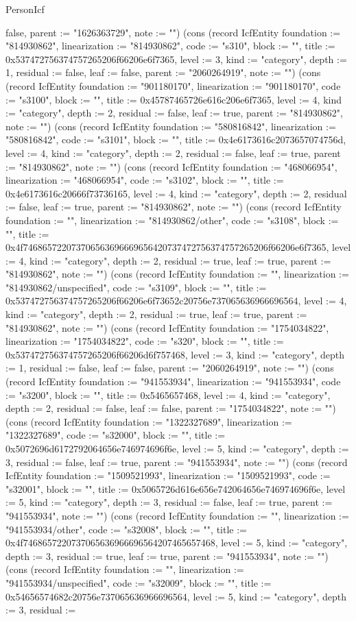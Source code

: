 \begin{lexlean}{PersonIcf}
\begin{semanticmodule}
{false, parent := "1626363729", note := ""}) (cons (record IcfEntity {foundation := "814930862", linearization := "814930862", code := "s310", block := "", title := 0x537472756374757265206f66206e6f7365, level := 3, kind := "category", depth := 1, residual := false, leaf := false, parent := "2060264919", note := ""}) (cons (record IcfEntity {foundation := "901180170", linearization := "901180170", code := "s3100", block := "", title := 0x45787465726e616c206e6f7365, level := 4, kind := "category", depth := 2, residual := false, leaf := true, parent := "814930862", note := ""}) (cons (record IcfEntity {foundation := "580816842", linearization := "580816842", code := "s3101", block := "", title := 0x4e6173616c2073657074756d, level := 4, kind := "category", depth := 2, residual := false, leaf := true, parent := "814930862", note := ""}) (cons (record IcfEntity {foundation := "468066954", linearization := "468066954", code := "s3102", block := "", title := 0x4e6173616c20666f73736165, level := 4, kind := "category", depth := 2, residual := false, leaf := true, parent := "814930862", note := ""}) (cons (record IcfEntity {foundation := "", linearization := "814930862/other", code := "s3108", block := "", title := 0x4f746865722073706563696669656420737472756374757265206f66206e6f7365, level := 4, kind := "category", depth := 2, residual := true, leaf := true, parent := "814930862", note := ""}) (cons (record IcfEntity {foundation := "", linearization := "814930862/unspecified", code := "s3109", block := "", title := 0x537472756374757265206f66206e6f73652c20756e737065636966696564, level := 4, kind := "category", depth := 2, residual := true, leaf := true, parent := "814930862", note := ""}) (cons (record IcfEntity {foundation := "1754034822", linearization := "1754034822", code := "s320", block := "", title := 0x537472756374757265206f66206d6f757468, level := 3, kind := "category", depth := 1, residual := false, leaf := false, parent := "2060264919", note := ""}) (cons (record IcfEntity {foundation := "941553934", linearization := "941553934", code := "s3200", block := "", title := 0x5465657468, level := 4, kind := "category", depth := 2, residual := false, leaf := false, parent := "1754034822", note := ""}) (cons (record IcfEntity {foundation := "1322327689", linearization := "1322327689", code := "s32000", block := "", title := 0x5072696d6172792064656e746974696f6e, level := 5, kind := "category", depth := 3, residual := false, leaf := true, parent := "941553934", note := ""}) (cons (record IcfEntity {foundation := "1509521993", linearization := "1509521993", code := "s32001", block := "", title := 0x5065726d616e656e742064656e746974696f6e, level := 5, kind := "category", depth := 3, residual := false, leaf := true, parent := "941553934", note := ""}) (cons (record IcfEntity {foundation := "", linearization := "941553934/other", code := "s32008", block := "", title := 0x4f7468657220737065636966696564207465657468, level := 5, kind := "category", depth := 3, residual := true, leaf := true, parent := "941553934", note := ""}) (cons (record IcfEntity {foundation := "", linearization := "941553934/unspecified", code := "s32009", block := "", title := 0x54656574682c20756e737065636966696564, level := 5, kind := "category", depth := 3, residual := }
\end{semanticmodule}
\end{lexlean}
